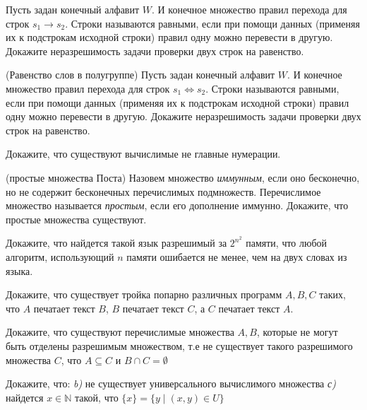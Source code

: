 \setcounter{curtask}{02}


\begin{task}
	Пусть задан конечный алфавит $W$. И конечное множество правил перехода для строк
    $s_1 \to s_2$. Строки называются равными, если при помощи данных (применяя их к
    подстрокам исходной строки) правил одну можно перевести в другую. Докажите
    неразрешимость задачи проверки двух строк на равенство.
\end{task}

\begin{task} (Равенство слов в полугруппе)
    Пусть задан конечный алфавит $W$. И конечное множество правил перехода для строк
    $s_1 \Leftrightarrow s_2$. Строки называются равными, если при помощи данных (применяя их к
    подстрокам исходной строки) правил одну можно перевести в другую. Докажите
    неразрешимость задачи проверки двух строк на равенство.
\end{task}

\begin{task}
    Докажите, что существуют вычислимые не главные нумерации.
\end{task}

\begin{task} (простые множества Поста)
    Назовем множество {\it иммунным}, если оно бесконечно, но не
    содержит бесконечных перечислимых подмножеств. Перечислимое
    множество называется {\it простым}, если его дополнение иммунно.
    Докажите, что простые множества существуют.
\end{task}


\breakline

\begin{ptask}{15}
	Докажите, что найдется такой язык разрешимый за $2^{n^2}$ памяти, что любой
    алгоритм, использующий $n$ памяти ошибается не менее, чем на двух словах из языка.
\end{ptask}

\begin{ptask}{16}
    Докажите, что существует тройка попарно различных программ $A, B,
    C$ таких, что $A$ печатает текст $B$, $B$ печатает текст $C$, а
    $C$ печатает текст $A$.
\end{ptask}

\begin{ptask}{17}
    Докажите, что существуют перечислимые множества $A, B$, которые не
    могут быть отделены разрешимым множеством, т.е не существует
    такого разрешимого множества $C$, что $A \subseteq C$ и $B \cap C
    = \emptyset$
\end{ptask}

\begin{ptask}{19}
    Докажите, что:
    {\it b)} не существует универсального вычислимого множества
    {\it с)} найдется $x \in \mathbb{N}$ такой, что $\{x\} = \{y
    \mid (x, y) \in U\}$
\end{ptask}